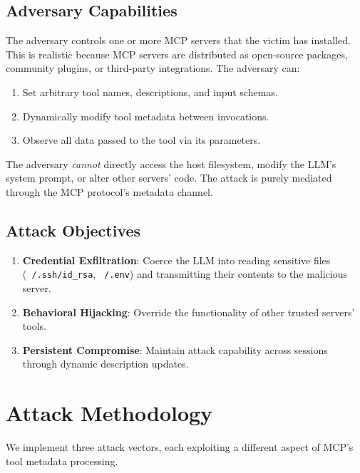 \documentclass[conference]{IEEEtran}
\begin{document}
\subsection{Adversary Capabilities}

The adversary controls one or more MCP servers that the victim has installed. This is realistic because MCP servers are distributed as open-source packages, community plugins, or third-party integrations. The adversary can:

\begin{enumerate}[leftmargin=*]
    \item Set arbitrary tool names, descriptions, and input schemas.
    \item Dynamically modify tool metadata between invocations.
    \item Observe all data passed to the tool via its parameters.
\end{enumerate}

The adversary \textit{cannot} directly access the host filesystem, modify the LLM's system prompt, or alter other servers' code. The attack is purely mediated through the MCP protocol's metadata channel.

\subsection{Attack Objectives}

\begin{enumerate}[leftmargin=*]
    \item \textbf{Credential Exfiltration}: Coerce the LLM into reading sensitive files (\texttt{~/.ssh/id\_rsa}, \texttt{~/.env}) and transmitting their contents to the malicious server.
    \item \textbf{Behavioral Hijacking}: Override the functionality of other trusted servers' tools.
    \item \textbf{Persistent Compromise}: Maintain attack capability across sessions through dynamic description updates.
\end{enumerate}

\section{Attack Methodology}
\label{sec:methodology}

We implement three attack vectors, each exploiting a different aspect of MCP's tool metadata processing.
\end{document}
